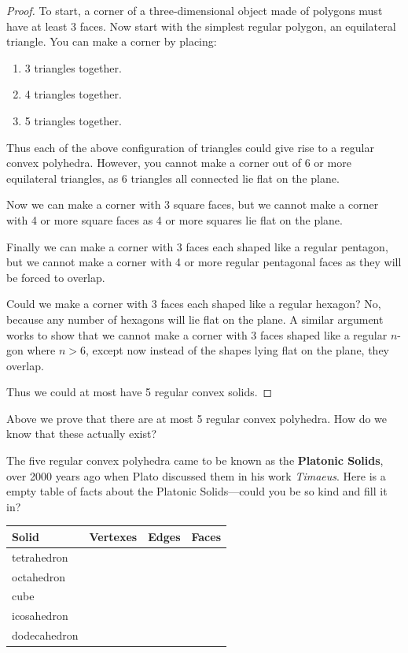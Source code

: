 \begin{proof} 
To start, a corner of a three-dimensional object made of polygons must
have at least 3 faces. Now start with the simplest regular polygon, an
equilateral triangle. You can make a corner by placing:
\begin{enumerate}
\item 3 triangles together.
\item 4 triangles together.
\item 5 triangles together.
\end{enumerate}
Thus each of the above configuration of triangles could give rise to a
regular convex polyhedra.  However, you cannot make a corner out of 6
or more equilateral triangles, as 6 triangles all connected lie flat
on the plane.

Now we can make a corner with 3 square faces, but we cannot make a
corner with 4 or more square faces as 4 or more squares lie flat on
the plane.

Finally we can make a corner with 3 faces each shaped like a regular
pentagon, but we cannot make a corner with 4 or more regular
pentagonal faces as they will be forced to overlap.

Could we make a corner with 3 faces each shaped like a regular
hexagon? No, because any number of hexagons will lie flat on the
plane. A similar argument works to show that we cannot make a corner
with 3 faces shaped like a regular $n$-gon where $n>6$, except now
instead of the shapes lying flat on the plane, they overlap.

Thus we could at most have 5 regular convex solids.
\end{proof}

\begin{ques}
Above we prove that there are at most 5 regular convex polyhedra. How
do we know that these actually exist?
\end{ques}
\QM

The five regular convex polyhedra came to be known as the
\textbf{Platonic Solids}, over 2000 years ago
when Plato discussed them in his work \textit{Timaeus}. Here is a
empty table of facts about the Platonic Solids---could you be so kind
and fill it in?
\begin{center}
{
\renewcommand{\arraystretch}{1.5}
\begin{tabular}{|l|c|c|c|}\hline
Solid & Vertexes & Edges & Faces\\
\hline\hline
tetrahedron &  &   &   \\ \hline
octahedron &   &  &   \\ \hline
cube &  &   &  \\ \hline
icosahedron &  &  &  \\ \hline
dodecahedron &  &  &  \\ \hline
\end{tabular}}
\end{center}


